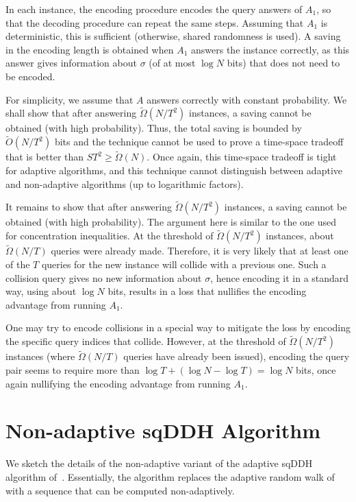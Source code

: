 \documentclass[11pt]{article}
\begin{document}
In each instance, the encoding procedure encodes the query answers of $A_1$, so that the decoding procedure
can repeat the same steps.
Assuming that $A_1$ is deterministic, this is sufficient (otherwise, shared randomness is used).  
A saving in the encoding length is obtained when $A_1$ answers the instance correctly,
as this answer gives information about $\sigma$ (of at most $\log N$ bits) 
that does not need to be encoded.  

For simplicity, we assume that $A$ answers correctly with constant probability. 
We shall show that after answering $\tilde{\Omega}(N/T^2)$ instances,
a saving cannot be obtained (with high probability).
Thus, the total saving is bounded by $\tilde{O}(N/T^2)$ bits
and the technique cannot be used to prove a time-space tradeoff that is better than
$S T^2 \geq \tilde{\Omega}(N)$.
Once again, this time-space tradeoff is tight for adaptive algorithms,
and this technique cannot distinguish between adaptive and non-adaptive algorithms (up to logarithmic factors).

It remains to show that after answering $\tilde{\Omega}(N/T^2)$ instances,
a saving cannot be obtained (with high probability). 
The argument here is similar to the one used for concentration inequalities.
At the threshold of $\tilde{\Omega}(N/T^2)$ instances, about $\tilde{\Omega}(N/T)$ queries were already made. Therefore, it is very likely that at least one of the $T$ queries for the new instance will collide with a previous one.
Such a collision query gives no new information about $\sigma$,
hence encoding it in a standard way, using about $\log N$ bits, results in a loss that
nullifies the encoding advantage from running $A_1$.

One may try to encode collisions in a special way to mitigate the loss
by encoding the specific query indices that collide.
However, 
at the threshold of $\tilde{\Omega}(N/T^2)$ instances
(where $\tilde{\Omega}(N/T)$ queries have already been issued),
encoding the query pair seems to require more than
 $\log T + (\log N - \log T) = \log N$ bits,
once again nullifying the encoding advantage from running $A_1$.

\section{Non-adaptive sqDDH Algorithm}
\label{app:sqddh}
We sketch the details of the non-adaptive variant of the adaptive sqDDH algorithm of~\cite{Corrigan-GibbsK18}.
Essentially, the algorithm replaces the adaptive random walk of~\cite{Corrigan-GibbsK18} with a sequence that can be computed non-adaptively. 
\end{document}
